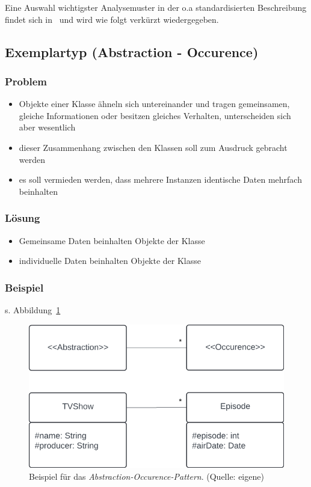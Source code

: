 Eine Auswahl wichtigster Analysemuster in der o.a standardisierten Beschreibung findet sich in~\cite[22 ff.]{Wed09b} und wird wie folgt verkürzt wiedergegeben.

\subsection{Exemplartyp (Abstraction - Occurence)}

\subsubsection*{Problem}
\begin{itemize}
    \item Objekte einer Klasse ähneln sich untereinander und tragen gemeinsamen, gleiche Informationen oder besitzen gleiches  Verhalten, unterscheiden sich aber wesentlich
    \item dieser Zusammenhang zwischen den Klassen soll zum Ausdruck gebracht werden
    \item es soll vermieden werden, dass mehrere Instanzen identische Daten mehrfach beinhalten
\end{itemize}

\subsubsection*{Lösung}
\begin{itemize}
    \item Gemeinsame Daten beinhalten Objekte der Klasse 
    \item individuelle Daten beinhalten Objekte der Klasse 
\end{itemize}

\subsubsection*{Beispiel}
s. Abbildung~\ref{fig:abstractionoccurence}

\begin{figure}
    \centering
    \includegraphics[scale=0.4]{part two/Objektorientierte Analyse/img/abstractionoccurence}
    \caption{Beispiel für das \textit{Abstraction-Occurence-Pattern}. (Quelle: eigene)}
    \label{fig:abstractionoccurence}
\end{figure}


